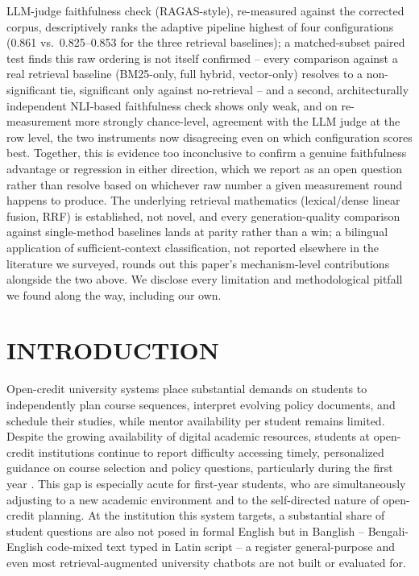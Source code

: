 \documentclass[a4paper,twoside]{article}
\begin{document}
{LLM-judge faithfulness check (RAGAS-style), re-measured against the corrected corpus, descriptively ranks the adaptive pipeline highest of four configurations (0.861 vs.\ 0.825--0.853 for the three retrieval baselines); a matched-subset paired test finds this raw ordering is not itself confirmed -- every comparison against a real retrieval baseline (BM25-only, full hybrid, vector-only) resolves to a non-significant tie, significant only against no-retrieval -- and a second, architecturally independent NLI-based faithfulness check shows only weak, and on re-measurement more strongly chance-level, agreement with the LLM judge at the row level, the two instruments now disagreeing even on which configuration scores best. Together, this is evidence too inconclusive to confirm a genuine faithfulness advantage or regression in either direction, which we report as an open question rather than resolve based on whichever raw number a given measurement round happens to produce. The underlying retrieval mathematics (lexical/dense linear fusion, RRF) is established, not novel, and every generation-quality comparison against single-method baselines lands at parity rather than a win; a bilingual application of sufficient-context classification, not reported elsewhere in the literature we surveyed, rounds out this paper's mechanism-level contributions alongside the two above. We disclose every limitation and methodological pitfall we found along the way, including our own.}

\onecolumn \maketitle \normalsize \setcounter{footnote}{0} \vfill

\section{\uppercase{Introduction}}
\label{sec:introduction}

Open-credit university systems place substantial demands on students to independently plan course sequences, interpret evolving policy documents, and schedule their studies, while mentor availability per student remains limited. Despite the growing availability of digital academic resources, students at open-credit institutions continue to report difficulty accessing timely, personalized guidance on course selection and policy questions, particularly during the first year \citep{nguyen2023lilo}. This gap is especially acute for first-year students, who are simultaneously adjusting to a new academic environment and to the self-directed nature of open-credit planning. At the institution this system targets, a substantial share of student questions are also not posed in formal English but in Banglish -- Bengali-English code-mixed text typed in Latin script -- a register general-purpose and even most retrieval-augmented university chatbots are not built or evaluated for.
\end{document}
